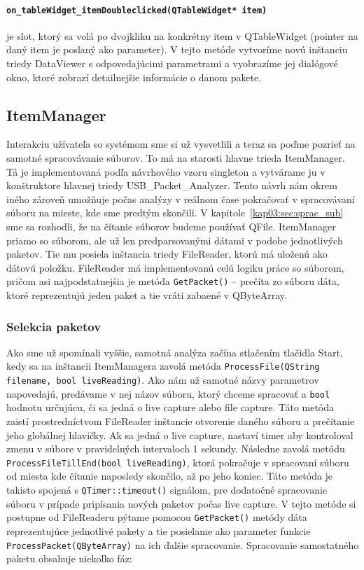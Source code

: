 \paragraph{\texttt{on\_tableWidget\_itemDoubleclicked(QTableWidget* item)}}

je slot, ktorý sa volá po dvojkliku na konkrétny item v QTableWidget (pointer na daný item je poslaný ako parameter). V tejto metóde vytvoríme novú inštanciu triedy DataViewer s odpovedajúcimi parametrami a vyobrazíme jej dialógové okno, ktoré zobrazí detailnejšie informácie o danom pakete.

\subsection{ItemManager}
\label{kap04:sec:item_manager}
Interakciu užívateľa so systémom sme si už vysvetlili a teraz sa poďme pozrieť na samotné spracovávanie súborov. To má na starosti hlavne trieda ItemManager. Tá je implementovaná podľa návrhového vzoru singleton a vytvárame ju v konštruktore hlavnej triedy USB\_Packet\_Analyzer. Tento návrh nám okrem iného zároveň umožňuje počas analýzy v reálnom čase pokračovať v spracovávaní súboru na mieste, kde sme predtým skončili. V kapitole~\ref{kap03:sec:sprac_sub} sme sa rozhodli, že na čítanie súborov budeme používať QFile. ItemManager priamo so súborom, ale už len predparsovanými dátami v podobe jednotlivých paketov. Tie mu posiela inštancia triedy FileReader, ktorú má uloženú ako dátovú položku. FileReader má implementovanú celú logiku práce so súborom, pričom asi najpodstatnejšia je metóda \texttt{GetPacket()} -- prečíta zo súboru dáta, ktoré reprezentujú jeden paket a tie vráti zabaené v QByteArray.

\subsubsection{Selekcia paketov}

Ako sme už spomínali vyššie, samotná analýza začína stlačením tlačidla Start, kedy sa na inštancii ItemManagera zavolá metóda \texttt{ProcessFile(QString filename, bool liveReading)}. Ako nám už samotné názvy parametrov napovedajú, predávame v nej názov súboru, ktorý chceme spracovať a \texttt{bool} hodnotu určujúcu, či sa jedná o live capture alebo file capture. Táto metóda zaistí prostredníctvom FileReader inštancie otvorenie daného súboru a prečítanie jeho globálnej hlavičky. Ak sa jedná o live capture, nastaví timer aby kontroloval zmenu v súbore v pravidelných intervaloch 1 sekundy. Následne zavolá metódu \texttt{ProcessFileTillEnd(bool liveReading)}, ktorá pokračuje v spracovaní súboru od miesta kde čítanie naposledy skončilo, až po jeho koniec. Táto metóda je takisto spojená s \texttt{QTimer::timeout()} signálom, pre dodatočné spracovanie súboru v prípade pripísania nových paketov počas live capture. V tejto metóde si postupne od FileReaderu pýtame pomocou \texttt{GetPacket()} metódy dáta reprezentujúce jednotlivé pakety a tie posielame ako parameter funkcie \texttt{ProcessPacket(QByteArray)} na ich ďalšie spracovanie. Spracovanie samostatného paketu obsahuje niekoľko fáz:
